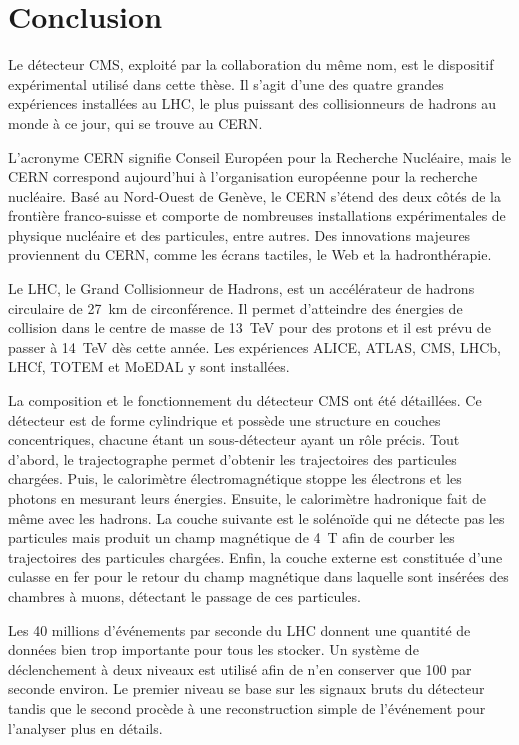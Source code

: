 \section{Conclusion}\label{chapter-LHC-section-conclusion}
Le détecteur CMS, exploité par la collaboration du même nom, est le dispositif expérimental utilisé dans cette thèse.
Il s'agit d'une des quatre grandes expériences installées au LHC, le plus puissant des collisionneurs de hadrons au monde à ce jour, qui se trouve au CERN.
\par L'acronyme \og CERN \fg{} signifie Conseil Européen pour la Recherche Nucléaire, mais le CERN correspond aujourd'hui à l'organisation européenne pour la recherche nucléaire.
Basé au Nord-Ouest de Genève, le CERN s'étend des deux côtés de la frontière franco-suisse et comporte de nombreuses installations expérimentales de physique nucléaire et des particules, entre autres.
Des innovations majeures proviennent du CERN, comme les écrans tactiles, le Web et la hadronthérapie.
\par Le LHC, le Grand Collisionneur de Hadrons, est un accélérateur de hadrons circulaire de \SI{27}{\kilo\meter} de circonférence.
Il permet d'atteindre des énergies de collision dans le centre de masse de \SI{13}{\TeV} pour des protons et il est prévu de passer à \SI{14}{\TeV} dès cette année.
Les expériences ALICE, ATLAS, CMS, LHCb, LHCf, TOTEM et MoEDAL y sont installées.
\par La composition et le fonctionnement du détecteur CMS ont été détaillées.
Ce détecteur est de forme cylindrique et possède une structure en couches concentriques, chacune étant un sous-détecteur ayant un rôle précis.
Tout d'abord, le trajectographe permet d'obtenir les trajectoires des particules chargées.
Puis, le calorimètre électromagnétique stoppe les électrons et les photons en mesurant leurs énergies.
Ensuite, le calorimètre hadronique fait de même avec les hadrons.
La couche suivante est le solénoïde qui ne détecte pas les particules mais produit un champ magnétique de \SI{4}{\tesla} afin de courber les trajectoires des particules chargées.
Enfin, la couche externe est constituée d'une culasse en fer pour le retour du champ magnétique dans laquelle sont insérées des chambres à muons, détectant le passage de ces particules.
\par Les 40 millions d'événements par seconde du LHC donnent une quantité de données bien trop importante pour tous les stocker.
Un système de déclenchement à deux niveaux est utilisé afin de n'en conserver que 100 par seconde environ.
Le premier niveau se base sur les signaux bruts du détecteur tandis que le second procède à une reconstruction simple de l'événement pour l'analyser plus en détails.
